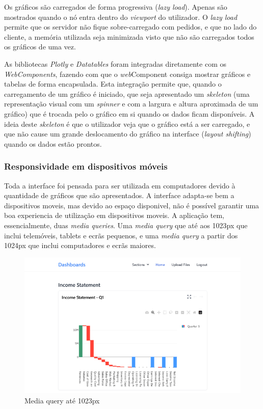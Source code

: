 Os gráficos são carregados de forma progressiva (\textit{lazy load}). Apenas são mostrados quando o nó entra dentro do \textit{viewport} do utilizador. O \textit{lazy load} permite que os servidor não fique sobre-carregado com pedidos, e que no lado do cliente, a memória utilizada seja minimizada visto que não são carregados todos os gráficos de uma vez.	

As bibliotecas \textit{Plotly} e \textit{Datatables} foram integradas diretamente com os \textit{WebComponents}\cite{webcomponents}, fazendo com que o \textit{web}Component consiga mostrar gráficos e tabelas de forma encapsulada. Esta integração permite que, quando o carregamento de um gráfico é iniciado, que seja apresentado  um \textit{skeleton} (uma representação visual com um \textit{spinner} e com a largura e altura aproximada de um gráfico) que é trocada pelo o gráfico em si quando os dados ficam disponíveis. A ideia deste \textit{skeleton} é que o utilizador veja que o gráfico está a ser carregado, e que não cause um grande deslocamento do gráfico na interface (\textit{layout shifting}) quando os dados estão prontos.

\subsubsection{Responsividade em dispositivos móveis}

Toda a interface foi pensada para ser utilizada em computadores devido à quantidade de gráficos que são apresentados. A interface adapta-se bem a dispositivos moveis, mas devido ao espaço disponivel, não é possível garantir uma boa experiencia de utilização em dispositivos moveis. A aplicação tem, essencialmente, duas \textit{media queries}. Uma \textit{media query} que até aos 1023px que inclui telemóveis, tablets e ecrãs pequenos, e uma \textit{media query} a partir dos 1024px que inclui computadores e ecrãs maiores.

\begin{figure}[H]
    \centering
    \includegraphics[max max width=\textwidth]{./img/res_1023}
 \caption{Media query até 1023px}
\end{figure}

